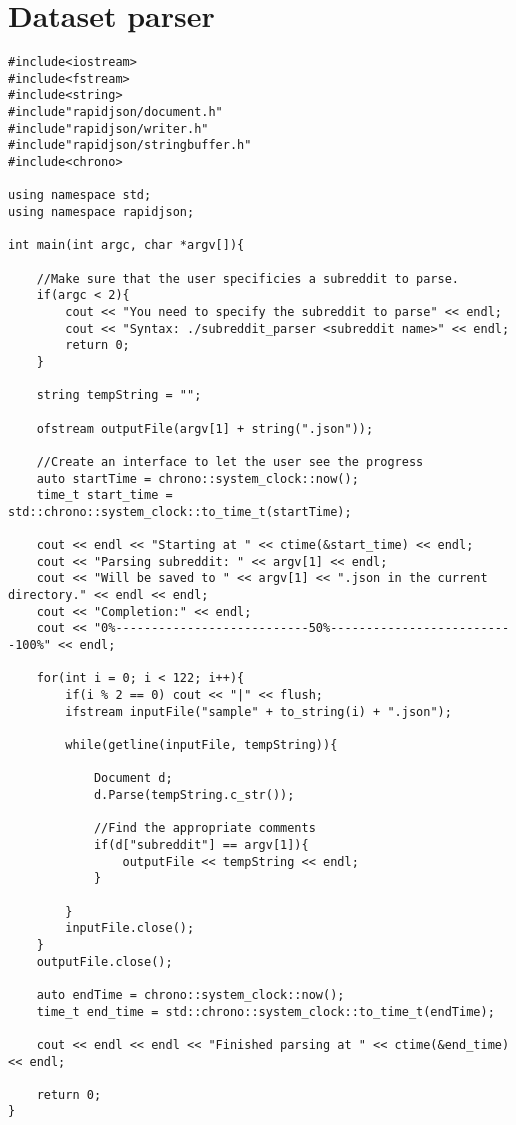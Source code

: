\section{Dataset parser}
\label{sec:AppendixParse}
\begin{lstlisting}
#include<iostream>
#include<fstream>
#include<string>
#include"rapidjson/document.h"
#include"rapidjson/writer.h"
#include"rapidjson/stringbuffer.h"
#include<chrono>

using namespace std;
using namespace rapidjson;

int main(int argc, char *argv[]){

	//Make sure that the user specificies a subreddit to parse.
	if(argc < 2){
		cout << "You need to specify the subreddit to parse" << endl;
		cout << "Syntax: ./subreddit_parser <subreddit name>" << endl;
		return 0;
	}

	string tempString = "";

	ofstream outputFile(argv[1] + string(".json"));

	//Create an interface to let the user see the progress
	auto startTime = chrono::system_clock::now();
	time_t start_time = std::chrono::system_clock::to_time_t(startTime);
	
	cout << endl << "Starting at " << ctime(&start_time) << endl;
	cout << "Parsing subreddit: " << argv[1] << endl;
	cout << "Will be saved to " << argv[1] << ".json in the current directory." << endl << endl;
	cout << "Completion:" << endl;
	cout << "0%---------------------------50%--------------------------100%" << endl;
	
	for(int i = 0; i < 122; i++){
		if(i % 2 == 0) cout << "|" << flush;
		ifstream inputFile("sample" + to_string(i) + ".json");

		while(getline(inputFile, tempString)){

			Document d;
			d.Parse(tempString.c_str());

			//Find the appropriate comments
			if(d["subreddit"] == argv[1]){
				outputFile << tempString << endl;
			}

		}
		inputFile.close();
	}
	outputFile.close();

	auto endTime = chrono::system_clock::now();
	time_t end_time = std::chrono::system_clock::to_time_t(endTime);
	
	cout << endl << endl << "Finished parsing at " << ctime(&end_time) << endl;

	return 0;
}

\end{lstlisting}

